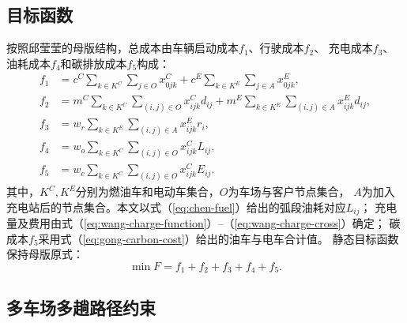 \subsection{目标函数}

按照邱莹莹\cite{ref:71}的母版结构，总成本由车辆启动成本$f_1$、行驶成本$f_2$、
充电成本$f_3$、油耗成本$f_4$和碳排放成本$f_5$构成：
\begin{align}
f_1&=c^C\sum_{k\in K^C}\sum_{j\in O}x_{0jk}^C
+c^E\sum_{k\in K^E}\sum_{j\in A}x_{0jk}^E,
\label{eq:qiu-f1}\\
f_2&=m^C\sum_{k\in K^C}\sum_{(i,j)\in O}x_{ijk}^Cd_{ij}
+m^E\sum_{k\in K^E}\sum_{(i,j)\in A}x_{ijk}^Ed_{ij},
\label{eq:qiu-f2}\\
f_3&=w_r\sum_{k\in K^E}\sum_{(i,j)\in A}x_{ijk}^Er_i,
\label{eq:qiu-f3}\\
f_4&=w_o\sum_{k\in K^C}\sum_{(i,j)\in O}x_{ijk}^CL_{ij},
\label{eq:qiu-f4}\\
f_5&=w_c\sum_{k\in K^C}\sum_{(i,j)\in O}x_{ijk}^CE_{ij}.
\label{eq:qiu-f5}
\end{align}
其中，$K^C,K^E$分别为燃油车和电动车集合，$O$为车场与客户节点集合，
$A$为加入充电站后的节点集合。本文以式（\ref{eq:chen-fuel}）给出的弧段油耗对应$L_{ij}$；
充电量及费用由式（\ref{eq:wang-charge-function}）--（\ref{eq:wang-charge-cross}）确定；
碳成本$f_5$采用式（\ref{eq:gong-carbon-cost}）给出的油车与电车合计值。
静态目标函数保持母版原式：
\begin{equation}
\min F=f_1+f_2+f_3+f_4+f_5.
\label{eq:obj}
\end{equation}

\subsection{多车场多趟路径约束}


